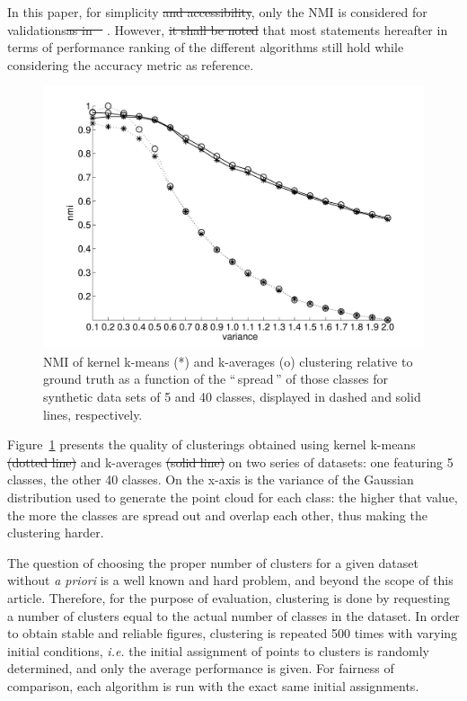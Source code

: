\documentclass[natbib,smallextended]{svjour3}
\newcommand{\gl}[1]{``\,#1\,''} %
\providecommand{\DIFaddtex}[1]{{\protect\color{blue}\uwave{#1}}} %
\providecommand{\DIFdeltex}[1]{{\protect\color{red}\sout{#1}}}                      %
\providecommand{\DIFaddbegin}{} %
\providecommand{\DIFaddend}{} %
\providecommand{\DIFdelbegin}{} %
\providecommand{\DIFdelend}{} %
\providecommand{\DIFadd}[1]{\texorpdfstring{\DIFaddtex{#1}}{#1}} %
\providecommand{\DIFdel}[1]{\texorpdfstring{\DIFdeltex{#1}}{}} %
\begin{document}
In this paper, for simplicity \DIFdelbegin \DIFdel{and accessibility}\DIFdelend \DIFaddbegin \DIFadd{sake}\DIFaddend , only the NMI is considered for validations\DIFdelbegin \DIFdel{as in \mbox{%
\citep{Kulis2008}}%
}\DIFdelend . However, \DIFdelbegin \DIFdel{it shall be noted }\DIFdelend \DIFaddbegin \DIFadd{we found }\DIFaddend that most statements hereafter in terms of performance ranking of the different algorithms still hold while considering the accuracy metric as reference.

\begin{figure}
\center
\includegraphics[width=.7\textwidth]{figures/synthetic.pdf}
\caption{NMI of kernel k-means (*) and k-averages (o) clustering relative to ground truth as a function of the \gl{spread} of those classes for synthetic data sets of 5 and 40 classes, displayed in dashed and solid lines, respectively.}
\label{fig:synth_perf}
\end{figure}

Figure~\ref{fig:synth_perf} presents the quality of clusterings obtained using kernel k-means \DIFdelbegin \DIFdel{(dotted line) }\DIFdelend and k-averages \DIFdelbegin \DIFdel{(solid line) }\DIFdelend on two series of datasets: one featuring 5 classes, the other 40 classes. On the x-axis is the variance of the Gaussian distribution used to generate the point cloud for each class: the higher that value, the more the classes are spread out and overlap each other, thus making the clustering harder.

The question of choosing the proper number of clusters for a given dataset without \textit{a priori} is a well known and hard problem, and beyond the scope of this article. Therefore, for the purpose of evaluation, clustering is done by requesting a number of clusters equal to the actual number of classes in the dataset. In order to obtain stable and reliable figures, clustering is repeated 500 times with varying initial conditions, \textit{i.e.} the initial assignment of points to clusters is randomly determined, and only the average performance is given. For fairness of comparison, each algorithm is run with the exact same initial assignments.
\end{document}
